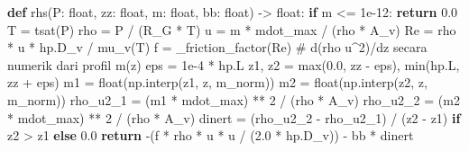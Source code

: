 \documentclass[
  indonesian,
  12pt,
  a4paper,
]{report}
\newenvironment{Shaded}{\begin{snugshade}}{\end{snugshade}}
\newcommand{\BuiltInTok}[1]{\textcolor[rgb]{0.00,0.23,0.31}{#1}}
\newcommand{\CommentTok}[1]{\textcolor[rgb]{0.37,0.37,0.37}{#1}}
\newcommand{\ControlFlowTok}[1]{\textcolor[rgb]{0.00,0.23,0.31}{\textbf{#1}}}
\newcommand{\DecValTok}[1]{\textcolor[rgb]{0.68,0.00,0.00}{#1}}
\newcommand{\FloatTok}[1]{\textcolor[rgb]{0.68,0.00,0.00}{#1}}
\newcommand{\KeywordTok}[1]{\textcolor[rgb]{0.00,0.23,0.31}{\textbf{#1}}}
\newcommand{\NormalTok}[1]{\textcolor[rgb]{0.00,0.23,0.31}{#1}}
\newcommand{\OperatorTok}[1]{\textcolor[rgb]{0.37,0.37,0.37}{#1}}
\begin{document}
\begin{Shaded}
\begin{Highlighting}[]
    \KeywordTok{def}\NormalTok{ rhs(P: }\BuiltInTok{float}\NormalTok{, zz: }\BuiltInTok{float}\NormalTok{, m: }\BuiltInTok{float}\NormalTok{, bb: }\BuiltInTok{float}\NormalTok{) }\OperatorTok{{-}\textgreater{}} \BuiltInTok{float}\NormalTok{:}
        \ControlFlowTok{if}\NormalTok{ m }\OperatorTok{\textless{}=} \FloatTok{1e{-}12}\NormalTok{:}
            \ControlFlowTok{return} \FloatTok{0.0}
\NormalTok{        T }\OperatorTok{=}\NormalTok{ tsat(P)}
\NormalTok{        rho }\OperatorTok{=}\NormalTok{ P }\OperatorTok{/}\NormalTok{ (R\_G }\OperatorTok{*}\NormalTok{ T)}
\NormalTok{        u }\OperatorTok{=}\NormalTok{ m }\OperatorTok{*}\NormalTok{ mdot\_max }\OperatorTok{/}\NormalTok{ (rho }\OperatorTok{*}\NormalTok{ A\_v)}
\NormalTok{        Re }\OperatorTok{=}\NormalTok{ rho }\OperatorTok{*}\NormalTok{ u }\OperatorTok{*}\NormalTok{ hp.D\_v }\OperatorTok{/}\NormalTok{ mu\_v(T)}
\NormalTok{        f }\OperatorTok{=}\NormalTok{ \_friction\_factor(Re)}
        \CommentTok{\# d(rho u\^{}2)/dz secara numerik dari profil m(z)}
\NormalTok{        eps }\OperatorTok{=} \FloatTok{1e{-}4} \OperatorTok{*}\NormalTok{ hp.L}
\NormalTok{        z1, z2 }\OperatorTok{=} \BuiltInTok{max}\NormalTok{(}\FloatTok{0.0}\NormalTok{, zz }\OperatorTok{{-}}\NormalTok{ eps), }\BuiltInTok{min}\NormalTok{(hp.L, zz }\OperatorTok{+}\NormalTok{ eps)}
\NormalTok{        m1 }\OperatorTok{=} \BuiltInTok{float}\NormalTok{(np.interp(z1, z, m\_norm))}
\NormalTok{        m2 }\OperatorTok{=} \BuiltInTok{float}\NormalTok{(np.interp(z2, z, m\_norm))}
\NormalTok{        rho\_u2\_1 }\OperatorTok{=}\NormalTok{ (m1 }\OperatorTok{*}\NormalTok{ mdot\_max) }\OperatorTok{**} \DecValTok{2} \OperatorTok{/}\NormalTok{ (rho }\OperatorTok{*}\NormalTok{ A\_v)}
\NormalTok{        rho\_u2\_2 }\OperatorTok{=}\NormalTok{ (m2 }\OperatorTok{*}\NormalTok{ mdot\_max) }\OperatorTok{**} \DecValTok{2} \OperatorTok{/}\NormalTok{ (rho }\OperatorTok{*}\NormalTok{ A\_v)}
\NormalTok{        dinert }\OperatorTok{=}\NormalTok{ (rho\_u2\_2 }\OperatorTok{{-}}\NormalTok{ rho\_u2\_1) }\OperatorTok{/}\NormalTok{ (z2 }\OperatorTok{{-}}\NormalTok{ z1) }\ControlFlowTok{if}\NormalTok{ z2 }\OperatorTok{\textgreater{}}\NormalTok{ z1 }\ControlFlowTok{else} \FloatTok{0.0}
        \ControlFlowTok{return} \OperatorTok{{-}}\NormalTok{(f }\OperatorTok{*}\NormalTok{ rho }\OperatorTok{*}\NormalTok{ u }\OperatorTok{*}\NormalTok{ u }\OperatorTok{/}\NormalTok{ (}\FloatTok{2.0} \OperatorTok{*}\NormalTok{ hp.D\_v)) }\OperatorTok{{-}}\NormalTok{ bb }\OperatorTok{*}\NormalTok{ dinert}


\end{Highlighting}
\end{Shaded}
\end{document}
